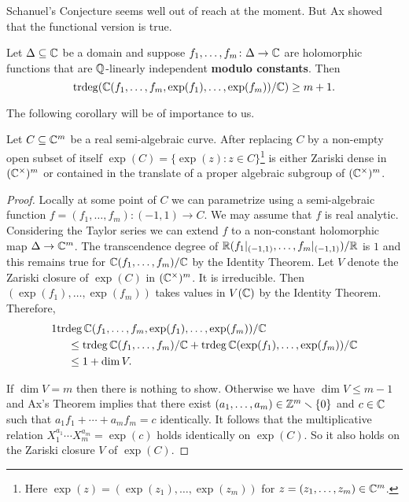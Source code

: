 
Schanuel's Conjecture seems well out of reach at the moment.
But Ax showed that the functional version is true. 

\begin{theorem}
  \label{thm:Axmult}
  Let $\Delta\subseteq{\mathbb{C}}$ be a domain and suppose
  $f_1,\ldots,f_m \colon\Delta \rightarrow{\mathbb{C}}$ are holomorphic
  functions that are ${\mathbb{Q}}$-linearly independent \textbf{modulo
    constants}. Then
  \begin{equation*}
    \mathrm{trdeg}({\mathbb{C}}(f_1,\ldots,f_m,\exp(f_1),\ldots,\exp(f_m))/{\mathbb{C}}) \ge
    m+1. 
  \end{equation*}  
\end{theorem}



The following corollary will be of importance to us. 

\begin{corollary}
  \label{cor:alw}
  Let $C\subseteq{\mathbb{C}}^m$ be a real semi-algebraic curve.
  After replacing $C$ by a non-empty open subset of itself
 $\exp(C)=\{\exp(z) :z\in
  C\}$\footnote{Here $\exp(z) = (\exp(z_1),\ldots,\exp(z_m))$ for
    $z=(z_1,\ldots,z_m)\in{\mathbb{C}}^m$.} is either Zariski dense in
  $({\mathbb{C}}^\times)^m$ or contained in
  the
  translate of a proper algebraic subgroup of $({\mathbb{C}}^\times)^m$.   
\end{corollary}
\begin{proof}  
  Locally at some point of $C$ we can parametrize using a
  semi-algebraic function $f=(f_1,\ldots,f_m)\colon (-1,1)\rightarrow C$. We may assume
  that $f$ is real
  analytic. Considering the Taylor series we can extend $f$ to a
  non-constant  holomorphic map $\Delta\rightarrow{\mathbb{C}}^m$. The
  transcendence degree of
  ${\mathbb{R}}({f_1}|_{(-1,1)},\ldots,{f_m}|_{(-1,1)})/{\mathbb{R}}$ is $1$ and this
  remains true for ${\mathbb{C}}(f_1,\ldots,f_m)/{\mathbb{C}}$ by the Identity Theorem.
  Let $V$ denote the Zariski closure of $\exp(C)$ in
  $({\mathbb{C}}^\times)^m$. It is irreducible. 
  Then $(\exp(f_1),\ldots,\exp(f_m))$ takes values in $V({\mathbb{C}})$ by
  the Identity Theorem.
  Therefore,
  \begin{alignat*}1
    &\mathrm{trdeg}\,\IC(f_1,\ldots,f_m,\exp(f_1),\ldots,\exp(f_m))/\IC
    \\
    &\quad \le
    \mathrm{trdeg}\,\IC(f_1,\ldots,f_m)/\IC+\mathrm{trdeg}\,\IC(\exp(f_1),\ldots,\exp(f_m))/\IC\\
    &\quad \le
    1+\dim V.
  \end{alignat*}


  If $\dim V=m$ then there is nothing to show. Otherwise we have $\dim
  V \le m-1$ and 
  Ax's Theorem implies that there exist
  $(a_1,\ldots,a_m)\in{\mathbb{Z}}^m\smallsetminus\{0\}$ and $c\in{\mathbb{C}}$ such that
  $a_1f_1+\cdots+a_mf_m=c$ identically. It follows that the
  multiplicative relation
  $X_1^{a_1}\cdots X_m^{a_m} = \exp(c)$ holds identically on
  $\exp(C)$. So it also holds on the Zariski closure $V$ of $\exp(C)$. 
\end{proof}

